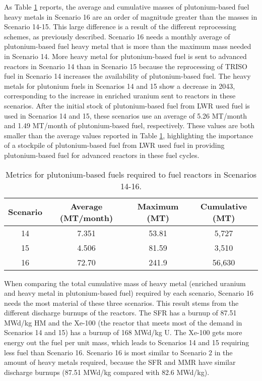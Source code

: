 As Table \ref{tab:s14-16_mox} reports, the average and cumulative 
masses of plutonium-based fuel heavy metals in Scenario 16 are an 
order of magnitude greater than the masses in Scenario 14-15. 
This large difference 
is a result of the different reprocessing schemes, as previously 
described. 
Scenario 16 needs a monthly average 
of plutonium-based fuel heavy metal that is more than the maximum mass 
needed in Scenario 14. More heavy metal for plutonium-based fuel
is sent to advanced reactors in Scenario 14 than  
in Scenario 15 because the reprocessing of \gls{TRISO} fuel in 
Scenario 14 increases the availability of 
plutonium-based fuel. The heavy metals for plutonium fuels 
in Scenarios 14 and 15 show a decrease in 2043, corresponding 
to the increase in enriched uranium sent to reactors in these 
scenarios. After the initial stock of plutonium-based fuel 
from \gls{LWR} used fuel is used in Scenarios 14 and 15, these 
scenarios use an 
average of 5.26 MT/month and 1.49 MT/month of plutonium-based 
fuel, respectively. These 
values are both smaller than the average values reported 
in Table \ref{tab:s14-16_mox}, highlighting the importance 
of a stockpile of plutonium-based fuel from \gls{LWR} used 
fuel in providing plutonium-based fuel for advanced reactors in these fuel 
cycles. 

\begin{table}[h!]
    \centering 
    \caption{Metrics for plutonium-based fuels required to fuel reactors 
    in Scenarios 14-16.}
    \label{tab:s14-16_mox}
    \begin{tabular}{c c c c}
        \hline 
        Scenario & Average (MT/month) & Maximum (MT) & Cumulative (MT) \\
        \hline 
        14 & 7.351 & 53.81 & 5,727 \\
        15 & 4.506 & 81.59 & 3,510 \\
        16 & 72.70 & 241.9 & 56,630 \\
        \hline
        
    \end{tabular}
\end{table}

When comparing the total cumulative mass of heavy metal (enriched 
uranium and heavy metal in plutonium-based fuel) required by each scenario,
Scenario 16 needs the most material of these three scenarios. This 
result stems from the different discharge burnups of the reactors. The 
\gls{SFR} has a burnup of 87.51 MWd/kg HM and the Xe-100 (the reactor that 
meets most of the demand in Scenarios 14 and 15) has a burnup of 168 MWd/kg U. 
The Xe-100 gets more energy out the fuel per unit mass, which leads to 
Scenarios 14 and 15 requiring less fuel than Scenario 16. Scenario 16 is most 
similar to Scenario 2 in the amount of heavy metals required, because
the \gls{SFR} and \gls{MMR} have similar discharge burnups (87.51 MWd/kg 
compared with 82.6 MWd/kg).

